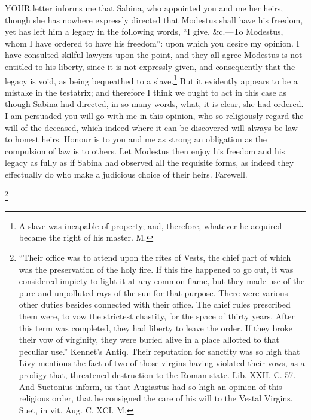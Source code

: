 YOUR letter informs me that Sabina, who appointed you and me her heirs,
though she has nowhere expressly directed that Modestus shall have his
freedom, yet has left him a legacy in the following words, ``I give, \&c.—To
Modestus, whom I have ordered to have his freedom'': upon which you desire
my opinion. I have consulted skilful lawyers upon the point, and they all
agree Modestus is not entitled to his liberty, since it is not expressly
given, and consequently that the legacy is void, as being bequeathed to a
slave.\footnote{A slave was incapable of
property; and, therefore, whatever he acquired became the right of his
master. M.}
But it evidently appears to be a mistake in the testatrix; and therefore I
think we ought to act in this case as though Sabina had directed, in so
many words, what, it is clear, she had ordered. I am persuaded you will go
with me in this opinion, who so religiously regard the will of the
deceased, which indeed where it can be discovered will always be law to
honest heirs. Honour is to you and me as strong an obligation as the
compulsion of law is to others. Let Modestus then enjoy his freedom and
his legacy as fully as if Sabina had observed all the requisite forms, as
indeed they effectually do who make a judicious choice of their heirs.
Farewell.


\footnote{``Their office was to
attend upon the rites of Vests, the chief part of which was the
preservation of the holy fire. If this fire happened to go out, it was
considered impiety to light it at any common flame, but they made use of
the pure and unpolluted rays of the sun for that purpose. There were
various other duties besides connected with their office. The chief rules
prescribed them were, to vow the strictest chastity, for the space of
thirty years. After this term was completed, they had liberty to leave the
order. If they broke their vow of virginity, they were buried alive in a
place allotted to that peculiar use.'' Kennet's Antiq. Their reputation for
sanctity was so high that Livy mentions the fact of two of those virgins
having violated their vows, as a prodigy that, threatened destruction to
the Roman state. Lib. XXII. C. 57. And Suetonius inform, us that Augiastus
had so high an opinion of this religious order, that he consigned the care
of his will to the Vestal Virgins. Suet, in vit. Aug. C. XCI. M.}

